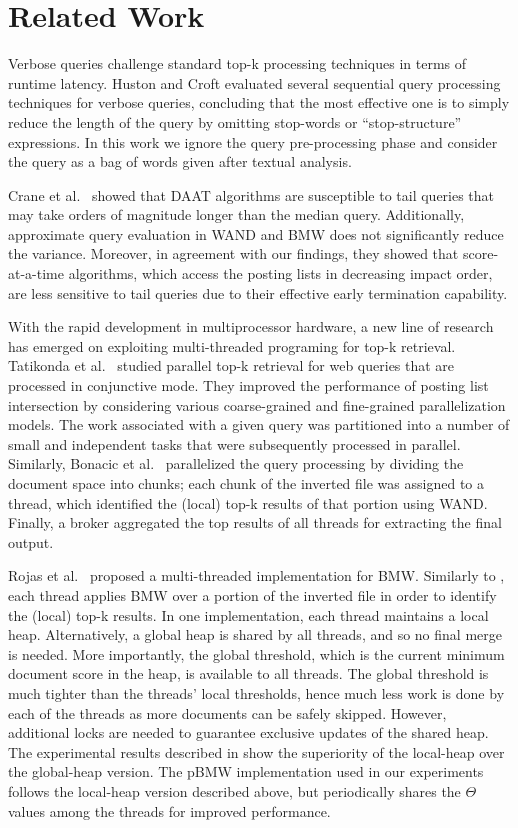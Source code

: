 \section{Related Work}
\label{sec:related}

Verbose queries challenge standard top-k processing techniques in terms of runtime latency. Huston and Croft \cite{Huston:2010} evaluated several sequential query processing techniques for verbose queries, concluding that the most effective one is to simply reduce the length of the query by omitting stop-words or ``stop-structure'' expressions. 
In this work we ignore the query pre-processing phase and consider the query as a bag of words given after textual analysis.

Crane et al.~\cite{Crane:2017} showed that DAAT algorithms are susceptible to tail queries that may take orders of magnitude longer than the median query. Additionally, approximate query evaluation in WAND and BMW does not significantly reduce the variance. Moreover, in agreement with our findings, they showed that score-at-a-time algorithms, which access the  posting lists in decreasing impact order, are less sensitive to tail queries due to their effective early termination capability. 

With the rapid development in multiprocessor hardware, a new line of research has emerged on exploiting multi-threaded programing for top-k retrieval. Tatikonda 
et al.~\cite{Tatikonda:2011} studied parallel top-k retrieval for web queries that are processed in conjunctive mode. They improved the performance of posting list intersection by considering various coarse-grained and fine-grained parallelization models. The work associated with a given query was partitioned into a number of small and independent tasks that were subsequently processed in parallel.  Similarly, Bonacic et al.~\cite{Bonacic:2010} parallelized the query processing by dividing the document space into chunks; each chunk of the inverted file was assigned to a thread, which identified the (local) top-k results of that portion using WAND. Finally, a broker aggregated the top results of all threads for extracting the final output. 

Rojas et al.~\cite{rojas2013efficient} proposed a multi-threaded implementation for BMW. Similarly to \cite{Bonacic:2010}, each thread applies BMW over a portion of the inverted file in order to identify the (local) top-k results. In one implementation, each thread maintains a local heap. Alternatively, a global heap is shared by all threads, and so no final merge is needed. More importantly, the global threshold, which is the current minimum document score in the heap, is available to all threads. The global threshold is much tighter than the threads' local thresholds, hence much less work is done by each of the threads as  more documents can be safely skipped. However, additional locks are needed to guarantee exclusive updates of the shared heap. The experimental results described in \cite{rojas2013efficient} show the superiority of the local-heap over the global-heap version. The pBMW implementation used in our experiments follows the local-heap version described above,
but periodically shares the  $\Theta$ values among the threads for improved performance.

